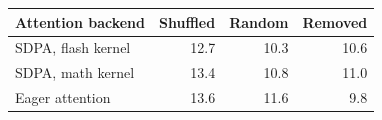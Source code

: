 \begin{tabular}{@{}lrrr@{}}
\toprule
Attention backend & Shuffled & Random & Removed \\
\midrule
SDPA, flash kernel & 12.7 & 10.3 & 10.6 \\
SDPA, math kernel & 13.4 & 10.8 & 11.0 \\
Eager attention & 13.6 & 11.6 & 9.8 \\
\bottomrule
\end{tabular}

